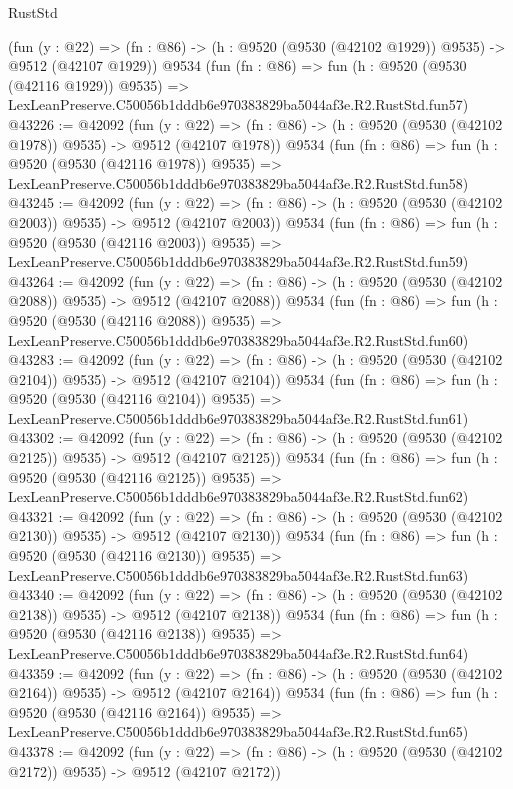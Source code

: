 \begin{lexlean}{RustStd}
\begin{coremodule}
    (fun (y : @22) =>
    (fn : @86) -> (h : @9520 (@9530 (@42102 @1929)) @9535) -> @9512 (@42107 @1929))
    @9534
    (fun (fn : @86) =>
    fun (h : @9520 (@9530 (@42116 @1929)) @9535) =>
    LexLeanPreserve.C50056b1dddb6e970383829ba5044af3e.R2.RustStd.fun57)
@43226 := @42092
    (fun (y : @22) =>
    (fn : @86) -> (h : @9520 (@9530 (@42102 @1978)) @9535) -> @9512 (@42107 @1978))
    @9534
    (fun (fn : @86) =>
    fun (h : @9520 (@9530 (@42116 @1978)) @9535) =>
    LexLeanPreserve.C50056b1dddb6e970383829ba5044af3e.R2.RustStd.fun58)
@43245 := @42092
    (fun (y : @22) =>
    (fn : @86) -> (h : @9520 (@9530 (@42102 @2003)) @9535) -> @9512 (@42107 @2003))
    @9534
    (fun (fn : @86) =>
    fun (h : @9520 (@9530 (@42116 @2003)) @9535) =>
    LexLeanPreserve.C50056b1dddb6e970383829ba5044af3e.R2.RustStd.fun59)
@43264 := @42092
    (fun (y : @22) =>
    (fn : @86) -> (h : @9520 (@9530 (@42102 @2088)) @9535) -> @9512 (@42107 @2088))
    @9534
    (fun (fn : @86) =>
    fun (h : @9520 (@9530 (@42116 @2088)) @9535) =>
    LexLeanPreserve.C50056b1dddb6e970383829ba5044af3e.R2.RustStd.fun60)
@43283 := @42092
    (fun (y : @22) =>
    (fn : @86) -> (h : @9520 (@9530 (@42102 @2104)) @9535) -> @9512 (@42107 @2104))
    @9534
    (fun (fn : @86) =>
    fun (h : @9520 (@9530 (@42116 @2104)) @9535) =>
    LexLeanPreserve.C50056b1dddb6e970383829ba5044af3e.R2.RustStd.fun61)
@43302 := @42092
    (fun (y : @22) =>
    (fn : @86) -> (h : @9520 (@9530 (@42102 @2125)) @9535) -> @9512 (@42107 @2125))
    @9534
    (fun (fn : @86) =>
    fun (h : @9520 (@9530 (@42116 @2125)) @9535) =>
    LexLeanPreserve.C50056b1dddb6e970383829ba5044af3e.R2.RustStd.fun62)
@43321 := @42092
    (fun (y : @22) =>
    (fn : @86) -> (h : @9520 (@9530 (@42102 @2130)) @9535) -> @9512 (@42107 @2130))
    @9534
    (fun (fn : @86) =>
    fun (h : @9520 (@9530 (@42116 @2130)) @9535) =>
    LexLeanPreserve.C50056b1dddb6e970383829ba5044af3e.R2.RustStd.fun63)
@43340 := @42092
    (fun (y : @22) =>
    (fn : @86) -> (h : @9520 (@9530 (@42102 @2138)) @9535) -> @9512 (@42107 @2138))
    @9534
    (fun (fn : @86) =>
    fun (h : @9520 (@9530 (@42116 @2138)) @9535) =>
    LexLeanPreserve.C50056b1dddb6e970383829ba5044af3e.R2.RustStd.fun64)
@43359 := @42092
    (fun (y : @22) =>
    (fn : @86) -> (h : @9520 (@9530 (@42102 @2164)) @9535) -> @9512 (@42107 @2164))
    @9534
    (fun (fn : @86) =>
    fun (h : @9520 (@9530 (@42116 @2164)) @9535) =>
    LexLeanPreserve.C50056b1dddb6e970383829ba5044af3e.R2.RustStd.fun65)
@43378 := @42092
    (fun (y : @22) =>
    (fn : @86) -> (h : @9520 (@9530 (@42102 @2172)) @9535) -> @9512 (@42107 @2172))

\end{coremodule}
\end{lexlean}
